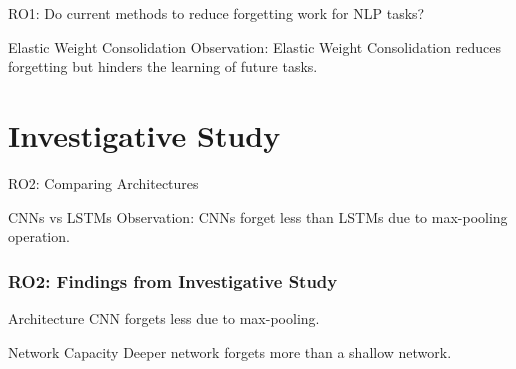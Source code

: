 \documentclass[aspectratio=169]{beamer}
\begin{document}
	\begin{frame}{RO1: Do current methods to reduce forgetting work for NLP tasks?}
	    \begin{block}{Elastic Weight Consolidation}
		Observation: Elastic Weight Consolidation reduces forgetting but hinders the learning of future tasks.
	    \end{block}\pause
	     { \begin{figure}[h]
		\centering
	    \end{figure}
	    }
	     { \begin{figure}[h]
		\centering
		
	\end{figure} }
	 \end{frame}

\section{Investigative Study}
	\begin{frame}{RO2: Comparing Architectures}
	    \begin{block}{CNNs vs LSTMs}
		Observation: CNNs forget less than LSTMs due to max-pooling operation.
	    \end{block}\pause
	    \begin{figure}[h]
		\centering
	    \end{figure}
	 \end{frame}
	\begin{frame}
		\frametitle{RO2: Findings from Investigative Study}
		\begin{block}{Architecture}
			CNN forgets less due to max-pooling.
		\end{block}
		\begin{block}{Network Capacity}
		    Deeper network forgets more than a shallow network.
		\end{block}

	\end{frame}
\end{document}
